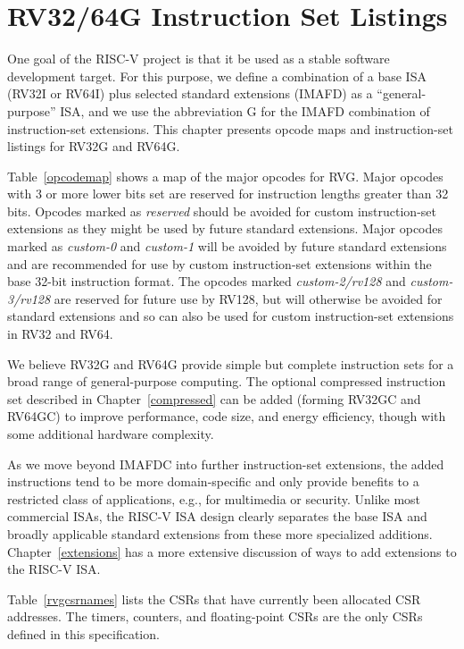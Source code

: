 \chapter{RV32/64G Instruction Set Listings}

One goal of the RISC-V project is that it be used as a stable software
development target.  For this purpose, we define a combination of a
base ISA (RV32I or RV64I) plus selected standard extensions (IMAFD) as
a ``general-purpose'' ISA, and we use the abbreviation G for the IMAFD
combination of instruction-set extensions.    This chapter presents
opcode maps and instruction-set listings for RV32G and RV64G.



Table~\ref{opcodemap} shows a map of the major opcodes for RVG.  Major
opcodes with 3 or more lower bits set are reserved for instruction
lengths greater than 32 bits.  Opcodes marked as {\em reserved} should
be avoided for custom instruction-set extensions as they might be used
by future standard extensions.  Major opcodes marked as {\em custom-0}
and {\em custom-1} will be avoided by future standard extensions and
are recommended for use by custom instruction-set extensions within
the base 32-bit instruction format.  The opcodes marked {\em
  custom-2/rv128} and {\em custom-3/rv128} are reserved for future use
by RV128, but will otherwise be avoided for standard extensions and so
can also be used for custom instruction-set extensions in RV32 and
RV64.

We believe RV32G and RV64G provide simple but complete instruction
sets for a broad range of general-purpose computing.  The optional
compressed instruction set described in Chapter~\ref{compressed} can
be added (forming RV32GC and RV64GC) to improve performance, code
size, and energy efficiency, though with some additional hardware
complexity.

As we move beyond IMAFDC into further instruction-set extensions, the
added instructions tend to be more domain-specific and only provide
benefits to a restricted class of applications, e.g., for multimedia
or security.  Unlike most commercial ISAs, the RISC-V ISA design
clearly separates the base ISA and broadly applicable standard
extensions from these more specialized additions.
Chapter~\ref{extensions} has a more extensive discussion of ways to
add extensions to the RISC-V ISA.



\FloatBarrier
Table~\ref{rvgcsrnames} lists the CSRs that have
currently been allocated CSR addresses.  The timers, counters, and
floating-point CSRs are the only CSRs defined in this specification.

